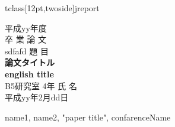 \documen 
  tclass[12pt,twoside]{jreport}  %
\usepackage{colortbl}                  %
\usepackage{thesis}                    %
\usepackage[dvipdfmx]{graphicx}         %
\usepackage{url}
\usepackage{amsmath}
\renewcommand{\bibname}{参考文献}      %

\begin{titlepage}
\parindent=0in
\begin{center}
\arge
\vspace*{3zh}
平成yy年度\\
卒 業 論 文\\ sdfafd
 \vspace*{3zh}
題 目 \\
{\LARGE\bf
論文タイトル\\
english title\\
}
\vspace*{3zh}
B5研究室 4年 氏 名\\[1cm]
平成yy年2月dd日\\
\vspace*{5mm}
\end{center}
\end{titlepage}

\setcounter{page}{1}   %
\tableofcontents       %
\listoffigures         %
\listoftables          %
\newpage


\setcounter{page}{1}     %

\setlength{\baselineskip}{20pt}



% 





\newpage

\begin{thebibliography}{99}%
 name1, name2, "paper title", confarenceName
\end{thebibliography}


 
    
 
 
 
 
